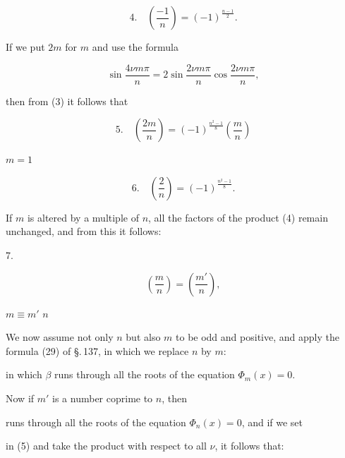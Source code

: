 \[
4.\quad \left(\frac{-1}{n}\right) = (-1)^{\frac{n-1}{2}}.
\]

If we put $2m$ for $m$ and use the formula

\[
\sin \frac{4\nu m \pi}{n} = 2 \sin \frac{2\nu m \pi}{n} \cos \frac{2\nu m \pi}{n},
\]

then from (3) it follows that

\[
5.\quad \left(\frac{2m}{n}\right) = (-1)^{\frac{n^2-1}{8}} \left(\frac{m}{n}\right)
\]

 $m = 1$

\[
6.\quad \left(\frac{2}{n}\right) = (-1)^{\frac{n^2-1}{8}}.
\]

If $m$ is altered by a multiple of $n$, all the
factors of the product (4) remain unchanged, and from this it follows:

7. 

\[
\left(\frac{m}{n}\right) = \left(\frac{m'}{n}\right),
\]

 $m \equiv m'$  $n$

We now assume not only $n$ but also $m$ to be odd
and positive, and apply the formula (29) of \S.\,137,
in which we replace $n$ by $m$:


in which $\beta$ runs through all the roots of the equation $\Phi_m(x) = 0$.


Now if $m'$ is a number coprime to $n$, then


runs through all the roots of the equation $\Phi_n(x) = 0$, and if
we set


in (5) and take the product with respect to all $\nu$, it follows that:

